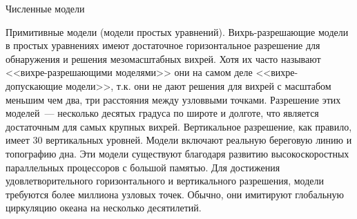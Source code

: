 \begin{chapter}{Численные модели}
\begin{section}{Примитивные модели (модели простых уравнений).}
Вихрь-разрешающие модели в простых уравнениях имеют достаточное
горизонтальное разрешение для обнаружения и решения мезомасштабных
вихрей. Хотя их часто называют <<вихре-разрешающими моделями>> они
на самом деле <<вихре-допускающие модели>>, т.к. они не дают решения
для вихрей с масштабом меньшим чем два, три расстояния между узловвыми
точками. Разрешение этих моделей~--- несколько десятых градуса по
широте и долготе, что является достаточным для самых крупных
вихрей. Вертикальное разрешение, как правило, имеет 30 вертикальных
уровней. Модели включают реальную береговую линию и топографию
дна. Эти модели существуют благодаря развитию высокоскоростных
параллельных процессоров с большой памятью. Для достижения
удовлетворительного горизонтального и вертикального разрешения, модели
требуются более миллиона узловых точек. Обычно, они имитируют
глобальную циркуляцию океана на несколько десятилетий.






\end{section}
\end{chapter}
